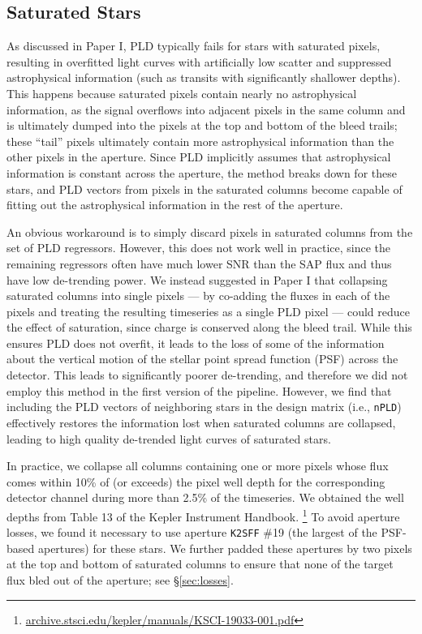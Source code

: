 \documentclass[]{emulateapj}
\begin{document}
\subsection{Saturated Stars}
\label{sec:impl_saturated}
As discussed in Paper I, PLD typically fails for stars with saturated pixels, resulting
in overfitted light curves with artificially low scatter and suppressed astrophysical 
information (such as transits with significantly shallower depths). This happens because
saturated pixels contain nearly no astrophysical information, as the signal
overflows into adjacent pixels in the same column and is ultimately dumped into the
pixels at the top and bottom of the bleed trails; these ``tail'' pixels ultimately contain more 
astrophysical information than the other pixels in the aperture. Since PLD implicitly
assumes that astrophysical information is constant across the aperture, the method
breaks down for these stars, and PLD vectors from pixels in the saturated columns become capable
of fitting out the astrophysical information in the rest of the aperture.

An obvious workaround is to simply discard pixels in saturated columns from the set of PLD 
regressors. However, this does not work well in practice, since the remaining regressors
often have much lower SNR than the SAP flux and thus have low de-trending power.
We instead suggested in Paper I that collapsing saturated columns into single pixels --- by co-adding
the fluxes in each of the pixels and treating the resulting timeseries as a single PLD pixel ---
could reduce the effect of saturation, since charge is conserved along the bleed trail. While
this ensures PLD does not overfit, it leads to the loss of some of the information about the 
vertical motion of the stellar point spread function (PSF) across the detector. This leads to significantly poorer
de-trending, and therefore we did not employ this method in the first version of the pipeline.
However, we find that including the PLD vectors of neighboring stars in the design matrix 
(i.e., \texttt{nPLD}) effectively restores the information lost when saturated columns are 
collapsed, leading to high quality de-trended light curves of saturated stars.

In practice, we collapse all columns containing one or more pixels whose flux 
comes within 10\% of (or exceeds)
the pixel well depth for the corresponding detector channel during more than 2.5\% of the
timeseries. We obtained the well depths from
Table 13 of the Kepler Instrument Handbook.
\footnote{\url{archive.stsci.edu/kepler/manuals/KSCI-19033-001.pdf}} To avoid aperture
losses, we found it necessary to use aperture \texttt{K2SFF} \#19 (the largest of the PSF-based
apertures) for these stars. We further padded these apertures by two pixels at the top
and bottom of saturated columns to ensure that none of the target flux bled out of the
aperture; see \S\ref{sec:losses}.
\end{document}
